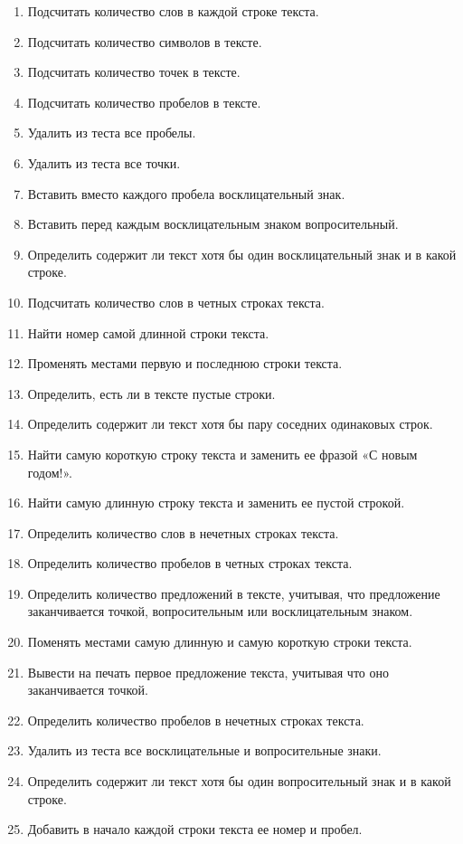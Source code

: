 \begin{enumerate}
\item Подсчитать количество слов в каждой строке текста.
\item Подсчитать количество символов в тексте.
\item Подсчитать количество точек в тексте.
\item Подсчитать количество пробелов в тексте.
\item Удалить из теста все пробелы.
\item Удалить из теста все точки.
\item Вставить вместо каждого пробела восклицательный знак.
\item Вставить перед каждым восклицательным знаком вопросительный.
\item Определить содержит ли текст хотя бы один восклицательный знак и в какой строке.
\item Подсчитать количество слов в четных строках текста.
\item Найти номер самой длинной строки текста.
\item Променять местами первую и последнюю строки текста.
\item Определить, есть ли в тексте пустые строки.
\item Определить содержит ли текст хотя бы пару соседних одинаковых строк.
\item Найти самую короткую строку текста и заменить ее фразой «С новым годом!».
\item Найти самую длинную строку текста и заменить ее пустой строкой.
\item Определить количество слов в нечетных строках текста.
\item Определить количество пробелов в четных строках текста.
\item Определить количество предложений в тексте, учитывая, что предложение заканчивается точкой, вопросительным или
восклицательным знаком.
\item Поменять местами самую длинную и самую короткую строки текста.
\item Вывести на печать первое предложение текста, учитывая что оно заканчивается точкой.
\item Определить количество пробелов в нечетных строках текста.
\item Удалить из теста все восклицательные и вопросительные знаки.
\item Определить содержит ли текст хотя бы один вопросительный знак и в какой строке.
\item Добавить в начало каждой строки текста ее номер и пробел.
\end{enumerate}
